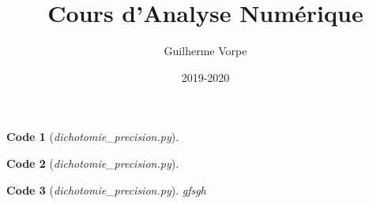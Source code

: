 \documentclass[11pt,a4paper,twoside]{report}
\title{Cours d'Analyse Numérique}
\author{Guilherme Vorpe}
\date{2019-2020}
\newcommand{\myinputlisting}[1] {
    
  }
\newcommand{\myinputlisting}[1] {
    
  }
\theoremstyle{amoi}
\newtheorem{algo}{Code}
\newcommand{\insertcode}[3]{
\begin{minipage}[t][][b]{#3\textwidth}
\begin{algo}[{\sl{\color{gray}#2}}]
\myinputlisting{#1}  
\end{algo}
\end{minipage}
}
\begin{document}
\insertcode{dichotomie_precision.py}{dichotomie\_precision.py}{0.58}


\begin{algo}[{\sl{\color{gray}dichotomie\_precision.py}}]
\myinputlisting{dichotomie_precision.py}  
\end{algo}

\begin{algo}[{\sl{\color{gray}dichotomie\_precision.py}}]
gfsgh 
\end{algo}


\myinputlisting{dichotomie_precision.py} 
\end{document}
